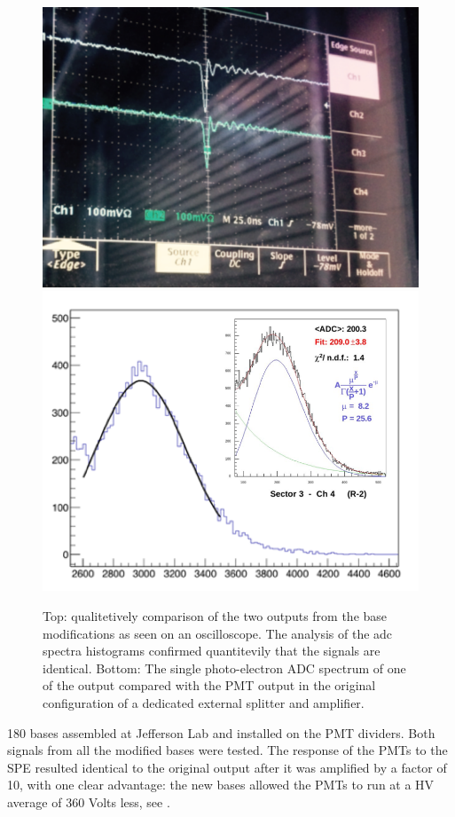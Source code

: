 \begin{figure}
	\centering
	\includegraphics[width=0.87\columnwidth,keepaspectratio]{img/doubleSignal.png}
	\includegraphics[width=0.97\columnwidth,keepaspectratio]{img/fadcOutput.png}
	\caption{Top: qualitetively comparison of the two outputs from the base modifications as seen on an oscilloscope.
				The analysis of the adc spectra histograms confirmed quantitevily that the signals are identical. Bottom:
				The single photo-electron ADC spectrum of one of the output compared with the PMT output in the original
            configuration of a dedicated external splitter and amplifier.
    }
	\label{fig:dividerTests}
\end{figure}

180 bases assembled at Jefferson Lab and installed on the PMT dividers. Both signals from all the modified bases were tested.
The response of the PMTs to the SPE resulted identical to the original output after it was amplified by a factor of 10, with one
clear advantage: the new bases allowed the PMTs to run at a HV average of 360 Volts less, see .



